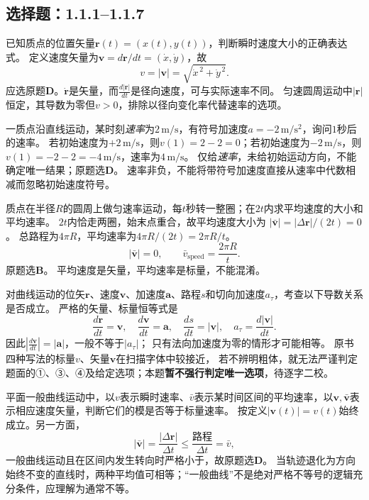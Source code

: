 
\subsection{选择题：1.1.1--1.1.7}
\problemtext 已知质点的位置矢量$\bm r(t)=(x(t),y(t))$，判断瞬时速度大小的正确表达式。
\workings
定义速度矢量为$\bm v=d\bm r/dt=(\dot x,\dot y)$，故
\[
 \boxed{v=|\bm v|=\sqrt{\dot x^{\,2}+\dot y^{\,2}}}.
\]
应选原题\textbf{D}。$\dot{\bm r}$是矢量，而$\frac{d|\bm r|}{dt}$是径向速度，可与实际速率不同。
\crosscheck 匀速圆周运动中$|\bm r|$恒定，其导数为零但$v>0$，排除以径向变化率代替速率的选项。

\problemtext 一质点沿直线运动，某时刻\emph{速率}为$2\,\mathrm{m/s}$，有符号加速度$a=-2\,\mathrm{m/s^2}$，询问$1$秒后的速率。
\workings
若初始速度为$+2\,\mathrm{m/s}$，则$v(1)=2-2=0$；若初始速度为$-2\,\mathrm{m/s}$，则$v(1)=-2-2=-4\,\mathrm{m/s}$，速率为$4\,\mathrm{m/s}$。
仅给\emph{速率}，未给初始运动方向，不能确定唯一结果；原题选\textbf{D}。
\crosscheck 速率非负，不能将带符号加速度直接从速率中代数相减而忽略初始速度符号。

\problemtext 质点在半径$R$的圆周上做匀速率运动，每$t$秒转一整圈；在$2t$内求平均速度的大小和平均速率。
\workings
$2t$内恰走两圈，始末点重合，故平均速度大小为
$|\bar{\bm v}|=|\Delta\bm r|/(2t)=0$。
总路程为$4\pi R$，平均速率为$4\pi R/(2t)=2\pi R/t$。
\[
\boxed{|\bar{\bm v}|=0,\qquad \bar v_{\mathrm{speed}}=\frac{2\pi R}{t}}.
\]
原题选\textbf{B}。
\crosscheck 平均速度是矢量，平均速率是标量，不能混淆。

\problemtext 对曲线运动的位矢$\bm r$、速度$\bm v$、加速度$\bm a$、路程$s$和切向加速度$a_\tau$，考查以下导数关系是否成立。
\workings
严格的矢量、标量恒等式是
\[
 \boxed{\frac{d\bm r}{dt}=\bm v,\quad
 \frac{d\bm v}{dt}=\bm a,\quad
 \frac{ds}{dt}=|\bm v|,\quad
 a_\tau=\frac{d|\bm v|}{dt}.}
\]
因此$\left|\frac{d\bm v}{dt}\right|=|\bm a|$，一般不等于$|a_\tau|$；
只有法向加速度为零的情形才可能相等。
\crosscheck 原书四种写法的标量$v$、矢量$\bm v$在扫描字体中较接近，
若不辨明粗体，就无法严谨判定题面的①、③、④及给定选项；本题\textbf{暂不强行判定唯一选项}，待逐字二校。

\problemtext 平面一般曲线运动中，以$v$表示瞬时速率、$\bar v$表示某时间区间的平均速率，以$\bm v,\bar{\bm v}$表示相应速度矢量，判断它们的模是否等于标量速率。
\workings
按定义$|\bm v(t)|=v(t)$始终成立。另一方面，
\[
 |\bar{\bm v}|=\frac{|\Delta\bm r|}{\Delta t}
 \le \frac{\text{路程}}{\Delta t}=\bar v,
\]
一般曲线运动且在区间内发生转向时严格小于，故原题选\textbf{D}。
\crosscheck 当轨迹退化为方向始终不变的直线时，两种平均值可相等；“一般曲线”不是绝对严格不等号的逻辑充分条件，应理解为通常不等。

